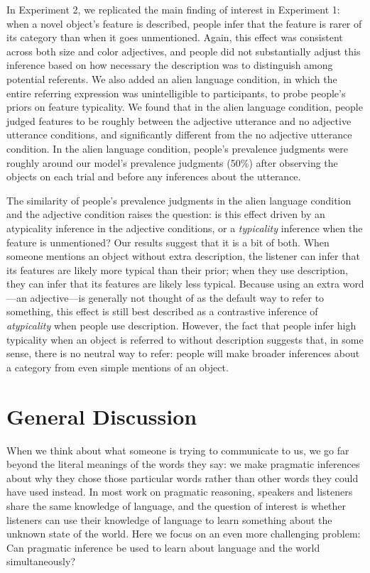 \documentclass{ucetd}
\begin{document}
In Experiment 2, we replicated the main finding of interest in
Experiment 1: when a novel object's feature is described, people infer
that the feature is rarer of its category than when it goes unmentioned.
Again, this effect was consistent across both size and color adjectives,
and people did not substantially adjust this inference based on how
necessary the description was to distinguish among potential referents.
We also added an alien language condition, in which the entire referring
expression was unintelligible to participants, to probe people's priors
on feature typicality. We found that in the alien language condition,
people judged features to be roughly between the adjective utterance and
no adjective utterance conditions, and significantly different from the
no adjective utterance condition. In the alien language condition,
people's prevalence judgments were roughly around our model's prevalence
judgments (50\%) after observing the objects on each trial and before
any inferences about the utterance.

The similarity of people's prevalence judgments in the alien language
condition and the adjective condition raises the question: is this
effect driven by an atypicality inference in the adjective conditions,
or a \emph{typicality} inference when the feature is unmentioned? Our
results suggest that it is a bit of both. When someone mentions an
object without extra description, the listener can infer that its
features are likely more typical than their prior; when they use
description, they can infer that its features are likely less typical.
Because using an extra word---an adjective---is generally not thought of
as the default way to refer to something, this effect is still best
described as a contrastive inference of \emph{atypicality} when people
use description. However, the fact that people infer high typicality
when an object is referred to without description suggests that, in some
sense, there is no neutral way to refer: people will make broader
inferences about a category from even simple mentions of an object.

\hypertarget{general-discussion-1}{%
\section{General Discussion}\label{general-discussion-1}}

When we think about what someone is trying to communicate to us, we go
far beyond the literal meanings of the words they say: we make pragmatic
inferences about why they chose those particular words rather than other
words they could have used instead. In most work on pragmatic reasoning,
speakers and listeners share the same knowledge of language, and the
question of interest is whether listeners can use their knowledge of
language to learn something about the unknown state of the world. Here
we focus on an even more challenging problem: Can pragmatic inference be
used to learn about language and the world simultaneously?
\end{document}
